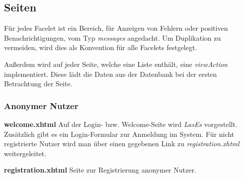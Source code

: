 \subsection{Seiten} \label{flt:pages}

Für jedes Facelet ist ein Bereich, für Anzeigen von Fehlern oder positiven Benachrichtigungen, vom Typ \emph{messages} angedacht.
Um Duplikation zu vermeiden, wird dies als Konvention für alle Facelets festgelegt.

Außerdem wird auf jeder Seite, welche eine Liste enthält, eine \emph{viewAction} implementiert.
Diese lädt die Daten aus der Datenbank bei der ersten Betrachtung der Seite.

\subsubsection{Anonymer Nutzer}

\begin{samepage}
\textbf{welcome.xhtml} Auf der Login- bzw. Welcome-Seite wird \emph{LasEs} vorgestellt.
Zusätzlich gibt es ein Login-Formular zur Anmeldung im System.
Für nicht registrierte Nutzer wird man über einen gegebenen Link zu \emph{registration.xhtml} weitergeleitet.
\nopagebreak

\end{samepage}

\begin{samepage}
    \textbf{registration.xhtml} Seite zur Registrierung anonymer Nutzer.
    \nopagebreak

\end{samepage}

